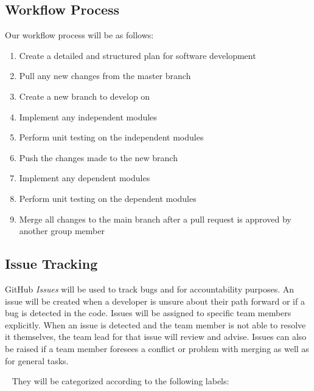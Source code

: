 \documentclass{article}
\begin{document}
\subsection{Workflow Process}

Our workflow process will be as follows:

\begin{enumerate}
\item Create a detailed and structured plan for software development
\item Pull any new changes from the master branch
\item Create a new branch to develop on
\item Implement any independent modules
\item Perform unit testing on the independent modules
\item Push the changes made to the new branch
\item Implement any dependent modules
\item Perform unit testing on the dependent modules
\item Merge all changes to the main branch after a pull request is approved by another group member
\end{enumerate}

\subsection{Issue Tracking}

GitHub \emph{Issues} will be used to track bugs and for accountability purposes. An issue will be created when a developer is unsure about their path forward or if a bug is detected in the code. Issues will be assigned to specific team members explicitly. When an issue is detected and the team member is not able to resolve it themselves, the team lead for that issue will review and advise. Issues can also be raised if a team member foresees a conflict or problem with merging as well as for general tasks. 

~\newline
They will be categorized according to the following labels:
\end{document}
